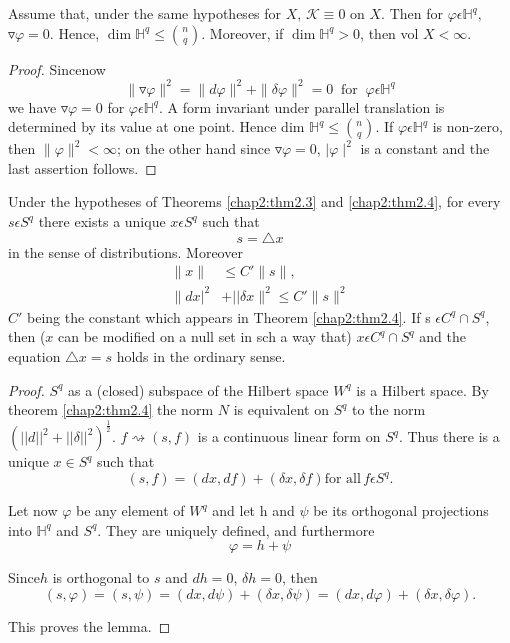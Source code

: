\setcounter{prop}{2}
\begin{prop}%
  Assume that, under the same hypotheses for $X$, $\mathcal{K}
  \equiv0$ on $X$. Then for 
  $\varphi\epsilon \mathbb{H}^q,$ $\triangledown\varphi = 0$. Hence,
  $\dim \mathbb{H}^q\leqslant \binom {n}{q}$. 
  Moreover, if $\dim \mathbb{H}^q>0$, then vol $X< \infty$.
\end{prop}

\begin{proof}
  Since\pageoriginale now
  $$
\parallel \triangledown \varphi \parallel^2 = \|d\varphi\|^2 +
  \|\delta\varphi\|^2 = 0 ~ \text{  for  } ~
  \varphi\epsilon\mathbb{H}^q 
$$ 
  we have $\triangledown\varphi = 0$ for
  $\varphi\epsilon\mathbb{H}^q$. A form invariant under parallel  
  translation is determined by its value at one point. Hence dim
  $\mathbb{H}^q \leqslant \binom{n}{q}$. If  
  $\varphi\epsilon\mathbb{H}^q$ is non-zero, then
  $\|\varphi\|^2<\infty$; on the other hand since
  $\triangledown\varphi  =0$, $\mid\varphi\mid^2$ is a constant and
  the last assertion follows. 
\end{proof}

\begin{lemma}\label{chap2:lem2.7}%
  Under the hypotheses of Theorems \ref{chap2:thm2.3} and
  \ref{chap2:thm2.4}, for every $s \epsilon S^q$ 
  there exists a unique $x \epsilon S^q$ such that
  $$ 
  s = \triangle x 
  $$
  in the sense of distributions. Moreover
  \begin{align*}
    \parallel x\parallel & \leqslant C{'}\parallel s \parallel ,\\
    \|dx|^2 & + ||\delta x\|^2\leq C{'}\parallel s \parallel ^2
  \end{align*}
  $C'$ being the constant which appears in Theorem
  \ref{chap2:thm2.4}. If s $\epsilon 
  C^q \cap S^q $, then ($x$ can be modified on a null 
  set in sch a way that)
  $x\epsilon C^q \cap S^q$ and the equation $\triangle x = s $ holds
  in the ordinary sense. 
\end{lemma}

\begin{proof}
  $S^q$ as a (closed) subspace of the Hilbert space $W^q$ is a Hilbert space.
  By theorem \ref{chap2:thm2.4} the norm $N$ is equivalent on $S^q$ to the norm
  $(||d||^2 + ||\delta||^2)^{\frac{1}{2}}$.  
  $f\rightsquigarrow (s,f)$ is a continuous linear form on $S^q$. Thus
  there is a unique $x \in S^q$ such that 
  $$ 
  (s,f) = (dx,df) + (\delta x,\delta f) \text {for all} \,f \epsilon
  S^q.
  $$

Let now $\varphi$ be any element of $W^q$ and let h and $\psi$ be its
orthogonal projections into $\mathbb{H}^q$ 
and $S^q$. They are uniquely defined, and furthermore
$$
\varphi = h + \psi 
$$

Since\pageoriginale $h$ is orthogonal to $s$ and $dh = 0$, $\delta h =
0$, then 
$$
(s,\varphi) = (s, \psi) = (dx, d \psi) + (\delta x, \delta \psi) =
(dx, d\varphi)+(\delta x, \delta \varphi).
$$

This proves the lemma.
\end{proof}

